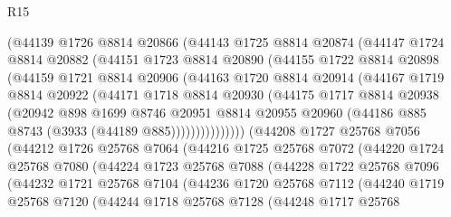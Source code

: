 \begin{lexlean}{R15}
\begin{coremodule}
          (@44139
            @1726
            @8814
            @20866
            (@44143
              @1725
              @8814
              @20874
              (@44147
                @1724
                @8814
                @20882
                (@44151
                  @1723
                  @8814
                  @20890
                  (@44155
                    @1722
                    @8814
                    @20898
                    (@44159
                      @1721
                      @8814
                      @20906
                      (@44163
                        @1720
                        @8814
                        @20914
                        (@44167
                          @1719
                          @8814
                          @20922
                          (@44171
                            @1718
                            @8814
                            @20930
                            (@44175
                              @1717
                              @8814
                              @20938
                              (@20942
                                @898
                                @1699
                                @8746
                                @20951
                                @8814
                                @20955
                                @20960
                                (@44186 @885 @8743 (@3933 (@44189 @885)))))))))))))))
        (@44208
          @1727
          @25768
          @7056
          (@44212
            @1726
            @25768
            @7064
            (@44216
              @1725
              @25768
              @7072
              (@44220
                @1724
                @25768
                @7080
                (@44224
                  @1723
                  @25768
                  @7088
                  (@44228
                    @1722
                    @25768
                    @7096
                    (@44232
                      @1721
                      @25768
                      @7104
                      (@44236
                        @1720
                        @25768
                        @7112
                        (@44240
                          @1719
                          @25768
                          @7120
                          (@44244
                            @1718
                            @25768
                            @7128
                            (@44248
                              @1717
                              @25768

\end{coremodule}
\end{lexlean}
